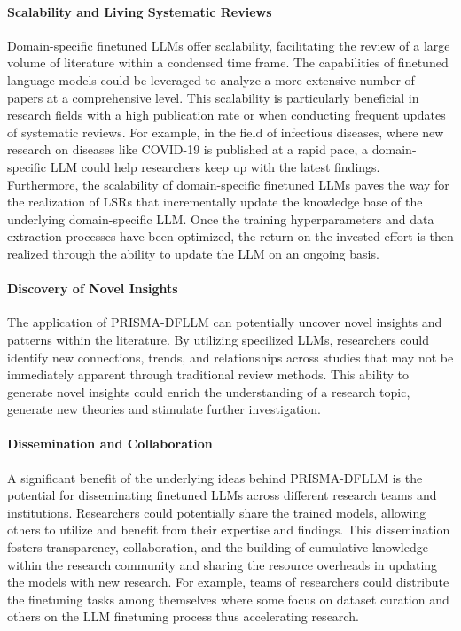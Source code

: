 \documentclass{article}
\begin{document}
\paragraph{Scalability and Living Systematic Reviews}

Domain-specific finetuned LLMs offer scalability, facilitating the review of a large volume of literature within a condensed time frame. The capabilities of finetuned language models could be leveraged to analyze a more extensive number of papers at a comprehensive level. This scalability is particularly beneficial in research fields with a high publication rate or when conducting frequent updates of systematic reviews. For example, in the field of infectious diseases, where new research on diseases like COVID-19 is published at a rapid pace, a domain-specific LLM could help researchers keep up with the latest findings. Furthermore, the scalability of domain-specific finetuned LLMs paves the way for the realization of LSRs that incrementally update the knowledge base of the underlying domain-specific LLM. Once the training hyperparameters and data extraction processes have been optimized, the return on the invested effort is then realized through the ability to update the LLM on an ongoing basis.

\paragraph{Discovery of Novel Insights}

The application of PRISMA-DFLLM can potentially uncover novel insights and patterns within the literature. By utilizing specilized LLMs, researchers could identify new connections, trends, and relationships across studies that may not be immediately apparent through traditional review methods. This ability to generate novel insights could enrich the understanding of a research topic, generate new theories and stimulate further investigation.

\paragraph{Dissemination and Collaboration}

A significant benefit of the underlying ideas behind PRISMA-DFLLM is the potential for disseminating finetuned LLMs across different research teams and institutions. Researchers could potentially share the trained models, allowing others to utilize and benefit from their expertise and findings. This dissemination fosters transparency, collaboration, and the building of cumulative knowledge within the research community and sharing the resource overheads in updating the models with new research. For example, teams of researchers could distribute the finetuning tasks among themselves where some focus on dataset curation and others on the LLM finetuning process thus accelerating research.
\end{document}

